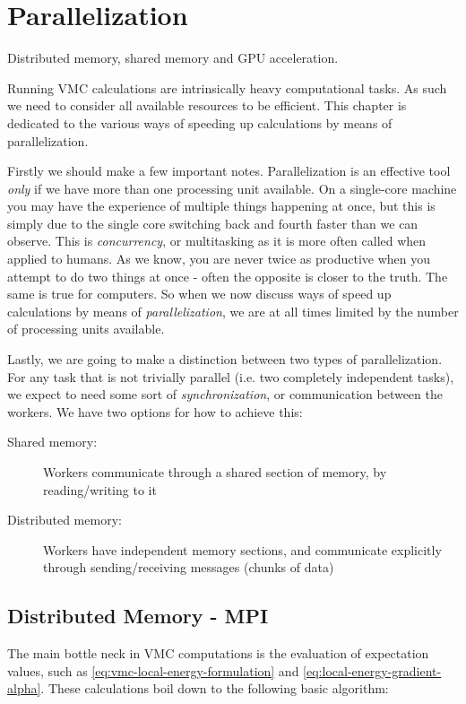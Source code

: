 \documentclass[Thesis.tex]{subfiles}
\begin{document}
\chapter{Parallelization}
\label{chp:parallelization}

Distributed memory, shared memory and GPU acceleration.

Running VMC calculations are intrinsically heavy computational tasks. As such we
need to consider all available resources to be efficient. This chapter is
dedicated to the various ways of speeding up calculations by means of
parallelization.

Firstly we should make a few important notes. Parallelization is an effective
tool \emph{only} if we have more than one processing unit available. On a
single-core machine you may have the experience of multiple things
happening at once, but this is simply due to the single core switching back and
fourth faster than we can observe. This is \emph{concurrency}, or multitasking
as it is more often called when applied to humans. As we know, you are never
twice as productive when you attempt to do two things at once - often the
opposite is closer to the truth. The same is true for computers. So when we now
discuss ways of speed up calculations by means of \emph{parallelization}, we are
at all times limited by the number of processing units available.

Lastly, we are going to make a distinction between two types of parallelization.
For any task that is not trivially parallel (i.e. two completely independent
tasks), we expect to need some sort of \emph{synchronization}, or communication
between the workers. We have two options for how to achieve this:

\begin{description}
\item[Shared memory:] Workers communicate through a shared section of memory, by
  reading/writing to it
  \item[Distributed memory:] Workers have independent memory sections, and
    communicate explicitly through sending/receiving messages (chunks of data)
\end{description}

\section{Distributed Memory - MPI}

The main bottle neck in VMC computations is the evaluation of expectation
values, such as \cref{eq:vmc-local-energy-formulation} and
\cref{eq:local-energy-gradient-alpha}. These calculations boil down to the
following basic algorithm:
\end{document}
